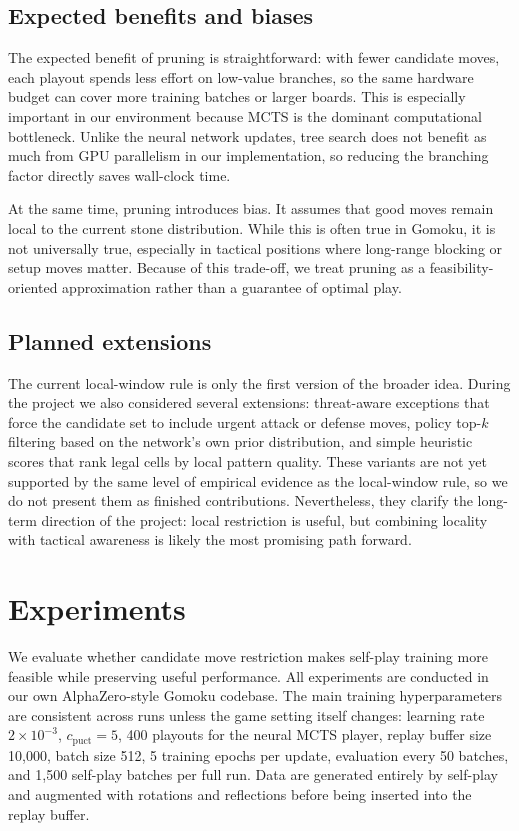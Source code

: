 \documentclass{article}
\begin{document}
\subsection{Expected benefits and biases}

The expected benefit of pruning is straightforward: with fewer candidate moves, each playout spends less effort on low-value branches, so the same hardware budget can cover more training batches or larger boards. This is especially important in our environment because MCTS is the dominant computational bottleneck. Unlike the neural network updates, tree search does not benefit as much from GPU parallelism in our implementation, so reducing the branching factor directly saves wall-clock time.

At the same time, pruning introduces bias. It assumes that good moves remain local to the current stone distribution. While this is often true in Gomoku, it is not universally true, especially in tactical positions where long-range blocking or setup moves matter. Because of this trade-off, we treat pruning as a feasibility-oriented approximation rather than a guarantee of optimal play.

\subsection{Planned extensions}

The current local-window rule is only the first version of the broader idea. During the project we also considered several extensions: threat-aware exceptions that force the candidate set to include urgent attack or defense moves, policy top-\(k\) filtering based on the network's own prior distribution, and simple heuristic scores that rank legal cells by local pattern quality. These variants are not yet supported by the same level of empirical evidence as the local-window rule, so we do not present them as finished contributions. Nevertheless, they clarify the long-term direction of the project: local restriction is useful, but combining locality with tactical awareness is likely the most promising path forward.

\section{Experiments}

We evaluate whether candidate move restriction makes self-play training more feasible while preserving useful performance. All experiments are conducted in our own AlphaZero-style Gomoku codebase. The main training hyperparameters are consistent across runs unless the game setting itself changes: learning rate \(2\times10^{-3}\), \(c_{\text{puct}}=5\), 400 playouts for the neural MCTS player, replay buffer size 10{,}000, batch size 512, 5 training epochs per update, evaluation every 50 batches, and 1{,}500 self-play batches per full run. Data are generated entirely by self-play and augmented with rotations and reflections before being inserted into the replay buffer.
\end{document}
